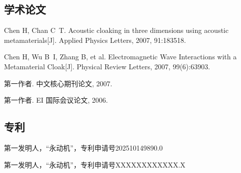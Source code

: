 \begin{achievements}

  \subsection*{学术论文}

  \begin{bibliolist}{00}
    \item Chen H, Chan C~T. Acoustic cloaking in three dimensions using acoustic metamaterials[J]. Applied Physics Letters, 2007, 91:183518.
    \item Chen H, Wu B~I, Zhang B, et al. Electromagnetic Wave Interactions with a Metamaterial Cloak[J]. Physical Review Letters, 2007, 99(6):63903.
  \end{bibliolist}

  \begin{bibliolist*}{00}
    \item 第一作者. 中文核心期刊论文, 2007.
    \item 第一作者. EI 国际会议论文, 2006.
  \end{bibliolist*}

  \subsection*{专利}

  \begin{bibliolist}{00}
    \item 第一发明人，“永动机”，专利申请号202510149890.0
  \end{bibliolist}

  \begin{bibliolist*}{00}
    \item 第一发明人，“永动机”，专利申请号XXXXXXXXXXXX.X
  \end{bibliolist*}

\end{achievements}
